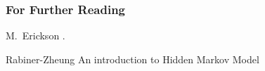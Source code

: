 \documentclass[compress]{beamer}
\begin{document}
\begin{frame}[allowframebreaks]
  \frametitle<presentation>{For Further Reading}
    
  \begin{thebibliography}{10}
    
  \beamertemplatebookbibitems

  \bibitem{}
    M.~Erickson
    .
 
    
  \beamertemplatearticlebibitems

  \bibitem{}
    Rabiner-Zheung
    \newblock An introduction
to Hidden Markov Model
  \end{thebibliography}
\end{frame}
\end{document}
